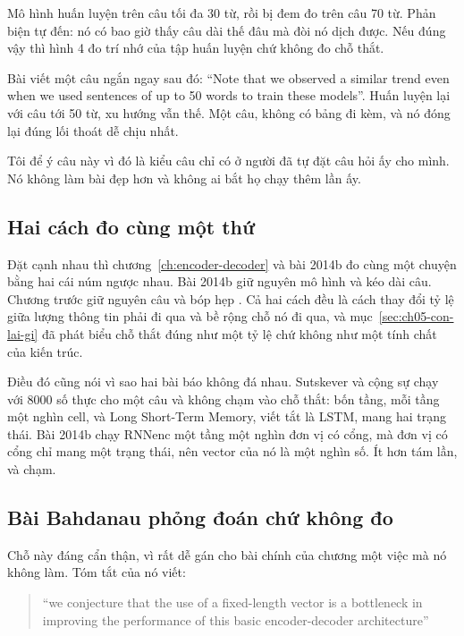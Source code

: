 %
Mô hình huấn luyện trên câu tối đa 30 từ, rồi bị đem đo trên câu 70 từ. Phản
biện tự đến: nó có bao giờ thấy câu dài thế đâu mà đòi nó dịch được. Nếu đúng
vậy thì hình 4 đo trí nhớ của tập huấn luyện chứ không đo chỗ thắt.

Bài viết một câu ngắn ngay sau đó: \enquote{Note that we observed a similar
trend even when we used sentences of up to 50 words to train these models}.
Huấn luyện lại với câu tới 50 từ, xu hướng vẫn thế. Một câu, không có bảng đi
kèm, và nó đóng lại đúng lối thoát dễ chịu nhất.

Tôi để ý câu này vì đó là kiểu câu chỉ có ở người đã tự đặt câu hỏi ấy cho
mình. Nó không làm bài đẹp hơn và không ai bắt họ chạy thêm lần ấy.

\subsection*{Hai cách đo cùng một thứ}

%
Đặt cạnh nhau thì chương~\ref{ch:encoder-decoder} và bài 2014b đo cùng một
chuyện bằng hai cái núm ngược nhau. Bài 2014b giữ nguyên mô hình và kéo dài câu.
Chương trước giữ nguyên câu và bóp hẹp . Cả
hai cách đều là cách thay đổi tỷ lệ giữa lượng thông tin phải đi qua và bề rộng
chỗ nó đi qua, và mục~\ref{sec:ch05-con-lai-gi} đã phát biểu chỗ thắt đúng như
một tỷ lệ chứ không như một tính chất của kiến trúc.

Điều đó cũng nói vì sao hai bài báo không đá nhau. Sutskever và cộng sự chạy
với 8000 số thực cho một câu và không chạm vào chỗ thắt: bốn tầng, mỗi tầng một
nghìn cell, và  Long Short-Term Memory, viết tắt là
LSTM, mang hai trạng thái. Bài 2014b chạy RNNenc một tầng
một nghìn đơn vị có cổng, mà đơn vị có cổng chỉ mang một trạng thái, nên vector
của nó là một nghìn số. Ít hơn tám lần, và chạm.

\subsection*{Bài Bahdanau phỏng đoán chứ không đo}

%
Chỗ này đáng cẩn thận, vì rất dễ gán cho bài chính của chương một việc mà nó
không làm. Tóm tắt của nó viết:

\begin{quote}
\enquote{we conjecture that the use of a fixed-length vector is a bottleneck in
improving the performance of this basic encoder-decoder architecture}
\end{quote}

